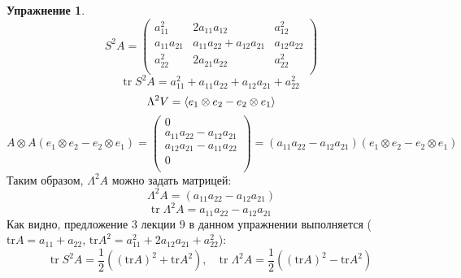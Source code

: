 \documentclass[12pt]{article}
\theoremstyle{definition}
\newtheorem{upr}[zad]{Упражнение}
\begin{document}
\begin{upr}
\begin{equation}
    \boxed{S^2A=
    \left(
    \begin{array}{ccc}
    a_{11}^2 & 2a_{11}a_{12} & a_{12}^2\\
    a_{11}a_{21} & a_{11}a_{22}+a_{12}a_{21} & a_{12}a_{22}\\
    a_{22}^2 & 2a_{21}a_{22} & a_{22}^2\\
    \end{array}
    \right)}
\end{equation}
\begin{equation}
    \boxed{\text{tr}\; S^2A=a_{11}^2+a_{11}a_{22}+a_{12}a_{21}+a_{22}^2}
\end{equation}
\begin{equation}
    \Lambda^2V=\braket{e_1\otimes e_2-e_2\otimes e_1}
\end{equation}
\begin{equation}
    A\otimes A(e_1\otimes e_2-e_2\otimes e_1)=\left(
    \begin{array}{c}
    0\\
    a_{11}a_{22}-a_{12}a_{21}\\
    a_{12}a_{21}-a_{11}a_{22}\\
    0\\
    \end{array}
    \right)=(a_{11}a_{22}-a_{12}a_{21})(e_1\otimes e_2-e_2\otimes e_1)
\end{equation}
Таким образом, $\Lambda^2A$ можно задать матрицей:
\begin{equation}
    \boxed{\Lambda^2A=(a_{11}a_{22}-a_{12}a_{21})}
\end{equation}
\begin{equation}
    \boxed{\text{tr}\; \Lambda^2A=a_{11}a_{22}-a_{12}a_{21}}
\end{equation}
Как видно, предложение 3 лекции 9 в данном упражнении выполняется ($\text{tr} A=a_{11}+a_{22}$, $\text{tr} A^2=a^2_{11}+2a_{12}a_{21}+a^2_{22}$):
\begin{equation}
    \text{tr}\; S^2A=\frac{1}{2}((\text{tr}A)^2+\text{tr} A^2),\quad \text{tr}\; \Lambda^2A=\frac{1}{2}((\text{tr}A)^2-\text{tr} A^2)
\end{equation}
\end{upr}
\end{document}
